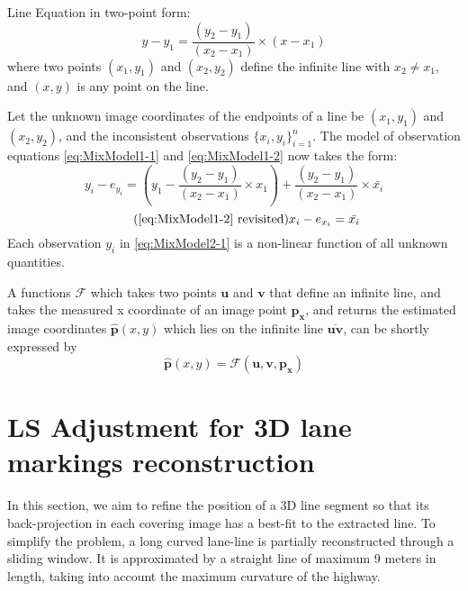 Line Equation in two-point form:
\begin{equation} \label{eq:LineInTwoPointForm}
y-y_1 = \dfrac{(y_2-y_1)}{(x_2-x_1)}\times(x-x_1)
\end{equation}
where two points $(x_1,y_1)$ and $(x_2,y_2)$ define the infinite line with $x_2\neq x_1$, and $(x,y)$ is any point on the line.

Let the unknown image coordinates of the endpoints of a line be $(x_1,y_1)$ and $(x_2,y_2)$, and the inconsistent observations $\{x_i,y_i\}^n_{i=1}$. The model of observation equations \eqref{eq:MixModel1-1} and \eqref{eq:MixModel1-2} now takes the form: 
\begin{equation} \label{eq:MixModel2-1}
y_i - e_{y_i}= (y_1-\dfrac{(y_2-y_1)}{(x_2-x_1)}\times x_1) + \dfrac{(y_2-y_1)}{(x_2-x_1)}\times \bar{x_i}
\end{equation}
\begin{equation} \tag{\ref{eq:MixModel1-2} revisited}
x_i-e_{x_i} = \bar{x_i}
\end{equation}
Each observation $y_i$ in \eqref{eq:MixModel2-1} is a non-linear function of all unknown quantities.

A functions $\mathcal{F}$ which takes two points $\mathbf{u}$ and $\mathbf{v}$ that define an infinite line, and takes the measured x coordinate of an image point $\mathbf{p_x}$, and returns the estimated image coordinates $\mathbf{\hat{p}}(x,y)$ which lies on the infinite line $\overline{\mathbf{u}\mathbf{v}}$, can be shortly expressed by
\begin{equation} \label{eq:Ffunction}
\mathbf{\hat{p}}(x,y) = \mathcal{F}(\mathbf{u},\mathbf{v},\mathbf{p_x}) 
\end{equation}




\clearpage
\section{LS Adjustment for 3D lane markings reconstruction}
\label{sec:LSadj}

In this section, we aim to refine the position of a 3D line segment so that its back-projection in each covering image has a best-fit to the extracted line. To simplify the problem, a long curved lane-line is partially reconstructed through a sliding window. It is approximated by a straight line of maximum 9 meters in length, taking into account the maximum curvature of the highway.

